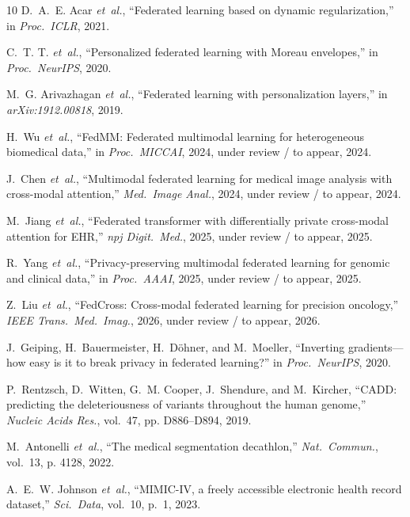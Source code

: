 \documentclass{ieeeaccess}
\begin{document}
\begin{thebibliography}{10}
D.~A.~E. Acar \emph{et~al.}, ``Federated learning based on dynamic
  regularization,'' in \emph{Proc.\ ICLR}, 2021.

C.~T. T. \emph{et~al.}, ``Personalized federated learning with {Moreau}
  envelopes,'' in \emph{Proc.\ NeurIPS}, 2020.

M.~G. Arivazhagan \emph{et~al.}, ``Federated learning with personalization
  layers,'' in \emph{arXiv:1912.00818}, 2019.

H.~Wu \emph{et~al.}, ``{FedMM}: Federated multimodal learning for heterogeneous
  biomedical data,'' in \emph{Proc.\ MICCAI}, 2024, under review / to appear,
  2024.

J.~Chen \emph{et~al.}, ``Multimodal federated learning for medical image
  analysis with cross-modal attention,'' \emph{Med.\ Image Anal.}, 2024, under
  review / to appear, 2024.

M.~Jiang \emph{et~al.}, ``Federated transformer with differentially private
  cross-modal attention for {EHR},'' \emph{npj Digit.\ Med.}, 2025, under
  review / to appear, 2025.

R.~Yang \emph{et~al.}, ``Privacy-preserving multimodal federated learning for
  genomic and clinical data,'' in \emph{Proc.\ AAAI}, 2025, under review / to
  appear, 2025.

Z.~Liu \emph{et~al.}, ``{FedCross}: Cross-modal federated learning for
  precision oncology,'' \emph{IEEE Trans.\ Med.\ Imag.}, 2026, under review /
  to appear, 2026.

J.~Geiping, H.~Bauermeister, H.~D\"{o}hner, and M.~Moeller, ``Inverting
  gradients---how easy is it to break privacy in federated learning?'' in
  \emph{Proc.\ NeurIPS}, 2020.

P.~Rentzsch, D.~Witten, G.~M. Cooper, J.~Shendure, and M.~Kircher, ``{CADD}:
  predicting the deleteriousness of variants throughout the human genome,''
  \emph{Nucleic Acids Res.}, vol.~47, pp. D886--D894, 2019.

M.~Antonelli \emph{et~al.}, ``The medical segmentation decathlon,'' \emph{Nat.\
  Commun.}, vol.~13, p. 4128, 2022.

A.~E.~W. Johnson \emph{et~al.}, ``{MIMIC-IV}, a freely accessible electronic
  health record dataset,'' \emph{Sci.\ Data}, vol.~10, p.~1, 2023.


\end{thebibliography}
\end{document}

